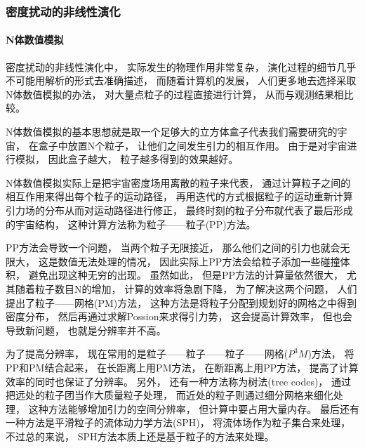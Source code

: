 \documentclass[8pt]{beamer}
\begin{document}
        \begin{frame}[fragile]
            \frametitle{密度扰动的非线性演化}
            \framesubtitle{N体数值模拟}
            \begin{multicols}{2} 
                \qquad
                密度扰动的非线性演化中，
                实际发生的物理作用非常复杂，
                演化过程的细节几乎不可能用解析的形式去准确描述，
                而随着计算机的发展，
                人们更多地去选择采取N体数值模拟的办法，
                对大量点粒子的过程直接进行计算，
                从而与观测结果相比较。

                \qquad
                N体数值模拟的基本思想就是取一个足够大的立方体盒子代表我们需要研究的宇宙，
                在盒子中放置N个粒子，
                让他们之间发生引力的相互作用。
                由于是对宇宙进行模拟，
                因此盒子越大，
                粒子越多得到的效果越好。

                \qquad
                N体数值模拟实际上是把宇宙密度场用离散的粒子来代表，
                通过计算粒子之间的相互作用来得出每个粒子的运动路径，
                再用迭代的方式根据粒子的运动重新计算引力场的分布从而对运动路径进行修正，
                最终时刻的粒子分布就代表了最后形成的宇宙结构，
                这种计算方法称为粒子——粒子(PP)方法。

                \qquad
                PP方法会导致一个问题，
                当两个粒子无限接近，
                那么他们之间的引力也就会无限大，
                这是数值无法处理的情况，
                因此实际上PP方法会给粒子添加一些碰撞体积，
                避免出现这种无穷的出现。
                虽然如此，
                但是PP方法的计算量依然很大，
                尤其随着粒子数目N的增加，
                计算的效率将急剧下降，
                为了解决这两个问题，
                人们提出了粒子——网格(PM)方法，
                这种方法是将粒子分配到规划好的网格之中得到密度分布，
                然后再通过求解Possion来求得引力势，
                这会提高计算效率，
                但也会导致新问题，
                也就是分辨率并不高。

                \qquad
                为了提高分辨率，
                现在常用的是粒子——粒子——粒子——网格($P^3M$)方法，
                将PP和PM结合起来，
                在长距离上用PM方法，
                在断距离上用PP方法，
                提高了计算效率的同时也保证了分辨率。
                另外，
                还有一种方法称为树法(tree codes)，
                通过把远处的粒子团当作大质量粒子处理，
                而近处的粒子则通过细分网格来细化处理，
                这种方法能够增加引力的空间分辨率，
                但计算中要占用大量内存。
                最后还有一种方法是平滑粒子的流体动力学方法(SPH)，
                将流体场作为粒子集合来处理，
                不过总的来说，
                SPH方法本质上还是基于粒子的方法来处理。

                
            \end{multicols}
        \end{frame}
        
\end{document}
